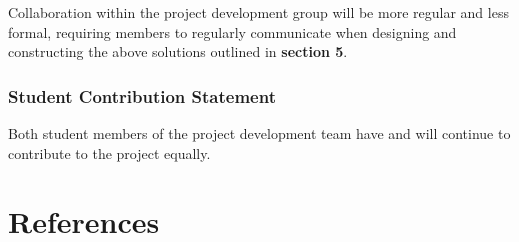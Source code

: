 \documentclass[11pt,]{article}
\begin{document}
Collaboration within the project development group will be more regular
and less formal, requiring members to regularly communicate when
designing and constructing the above solutions outlined in
\textbf{section 5}.

\subsubsection{Student Contribution
Statement}\label{student-contribution-statement}

Both student members of the project development team have and will
continue to contribute to the project equally.

\newpage


\onecolumn

\section{References}\label{references}
\end{document}
